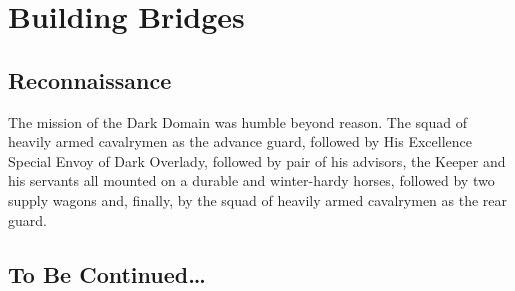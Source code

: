 \chapter{Building Bridges}

\section{Reconnaissance}

The mission of the Dark Domain was humble beyond reason. The squad of heavily armed cavalrymen as the advance guard, followed by His Excellence Special Envoy of Dark Overlady, followed by pair of his advisors, the Keeper and his servants all mounted on a durable and winter-hardy horses, followed by two supply wagons and, finally, by the squad of heavily armed cavalrymen as the rear guard.



\section{To Be Continued\dots}